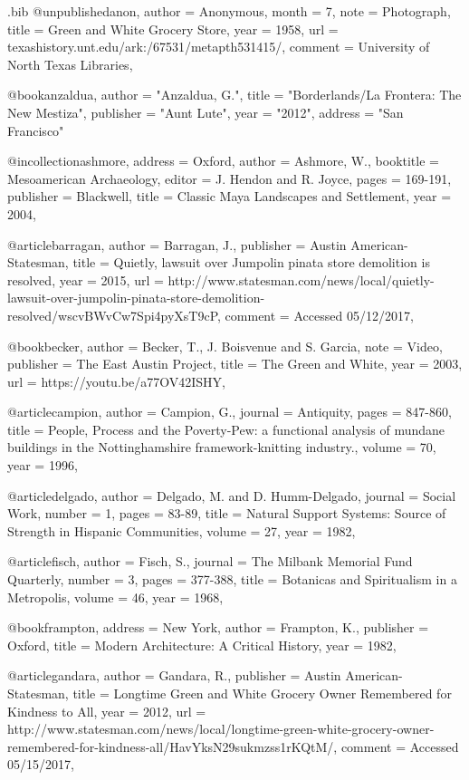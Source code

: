 \begin{filecontents}{\IJSRAidentifier.bib}
@unpublished{anon,
	author = {Anonymous},
	month = {7},
	note = {Photograph},
	title = {Green and White Grocery Store},
	year = {1958},
	url = {texashistory.unt.edu/ark:/67531/metapth531415/},
	comment = {University of North Texas Libraries},
}

@book{anzaldua,
	author    = "Anzaldua, G.",
	title     = "Borderlands/La Frontera: The New Mestiza",
	publisher = "Aunt Lute",
	year      = "2012",
	address   = "San Francisco"
}

@incollection{ashmore,
	address = {Oxford},
	author = {Ashmore, W.},
	booktitle = {Mesoamerican Archaeology},
	editor = {J. Hendon and R. Joyce},
	pages = {169-191},
	publisher = {Blackwell},
	title = {Classic Maya Landscapes and Settlement},
	year = {2004},
}

@article{barragan,
	author = {Barragan, J.},
	publisher = {Austin American-Statesman},
	title = {Quietly, lawsuit over Jumpolin pinata store demolition is resolved},
	year = {2015},
	url = {http://www.statesman.com/news/local/quietly-lawsuit-over-jumpolin-pinata-store-demolition-resolved/wscvBWvCw7Spi4pyXsT9cP},
	comment = {Accessed 05/12/2017},
}

@book{becker,
	author = {Becker, T., J. Boisvenue and S. Garcia},
	note = {Video},
	publisher = {The East Austin Project},
	title = {The Green and White},
	year = {2003},
	url = {https://youtu.be/a77OV42ISHY},
}

@article{campion,
	author = {Campion, G.},
	journal = {Antiquity},
	pages = {847-860},
	title = {People, Process and the Poverty-Pew: a functional analysis of mundane buildings in the Nottinghamshire framework-knitting industry.},
	volume = {70},
	year = {1996},
}

@article{delgado,
	author = {Delgado, M. and D. Humm-Delgado},
	journal = {Social Work},
	number = {1},
	pages = {83-89},
	title = {Natural Support Systems: Source of Strength in Hispanic Communities},
	volume = {27},
	year = {1982},
}

@article{fisch,
	author = {Fisch, S.},
	journal = {The Milbank Memorial Fund Quarterly},
	number = {3},
	pages = {377-388},
	title = {Botanicas and Spiritualism in a Metropolis},
	volume = {46},
	year = {1968},
}

@book{frampton,
	address = {New York},
	author = {Frampton, K.},
	publisher = {Oxford},
	title = {Modern Architecture: A Critical History},
	year = {1982},
}

@article{gandara,
	author = {Gandara, R.},
	publisher = {Austin American-Statesman},
	title = {Longtime Green and White Grocery Owner Remembered for Kindness to All},
	year = {2012},
	url = {http://www.statesman.com/news/local/longtime-green-white-grocery-owner-remembered-for-kindness-all/HavYksN29sukmzss1rKQtM/},
	comment = {Accessed 05/15/2017},
}


\end{filecontents}
